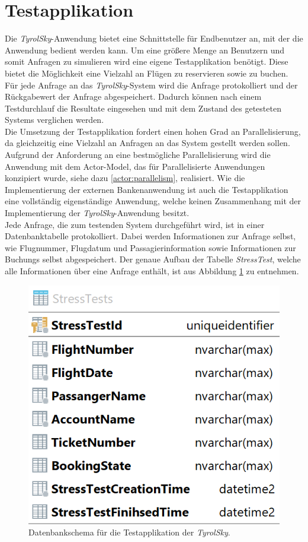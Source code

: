 \section{Testapplikation}
\label{subsec:implementation:TestApplikation} 
Die \textit{TyrolSky}-Anwendung bietet eine Schnittstelle für Endbenutzer an, mit der die Anwendung bedient werden kann. Um eine größere Menge an Benutzern und somit Anfragen zu simulieren wird eine eigene Testapplikation benötigt. Diese bietet die Möglichkeit eine Vielzahl an Flügen zu reservieren sowie zu buchen. Für jede Anfrage an das \textit{TyrolSky}-System wird die Anfrage protokolliert und der Rückgabewert der Anfrage abgespeichert. Dadurch können nach einem Testdurchlauf die Resultate eingesehen und mit dem Zustand des getesteten Systems verglichen werden. \\
Die Umsetzung der Testapplikation fordert einen hohen Grad an Parallelisierung, da gleichzeitig eine Vielzahl an Anfragen an das System gestellt werden sollen. Aufgrund der Anforderung an eine bestmögliche Parallelisierung wird die Anwendung mit dem Actor-Model, das für Parallelisierte Anwendungen konzipiert wurde, siehe dazu \ref{actor:parallelism}, realisiert. Wie die Implementierung der externen Bankenanwendung ist auch die Testapplikation eine vollständig eigenständige Anwendung, welche keinen Zusammenhang mit der Implementierung der \textit{TyrolSky}-Anwendung besitzt. \\
Jede Anfrage, die zum testenden System durchgeführt wird, ist in einer Datenbanktabelle protokolliert. Dabei werden Informationen zur Anfrage selbst, wie Flugnummer, Flugdatum und Passagierinformation sowie Informationen zur Buchungs selbst abgespeichert. Der genaue Aufbau der Tabelle \textit{StressTest}, welche alle Informationen über eine Anfrage enthält, ist aus Abbildung \ref{fig:implementation:stressTestDbSchema} zu entnehmen.
\begin{figure}
  \centering
  \includegraphics[width=0.4\linewidth]{gfx/implementation/stressTestDbSchema}
  \caption{Datenbankschema für die Testapplikation der \textit{TyrolSky}.}
  \label{fig:implementation:stressTestDbSchema}
\end{figure} 

